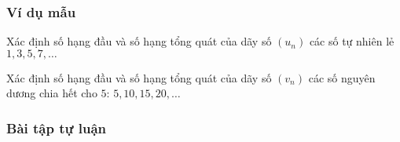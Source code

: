 \subsubsection{Ví dụ mẫu}
\begin{vd}[NB]%
	Xác định số hạng đầu và số hạng tổng quát của dãy số $(u_n)$ các số tự nhiên lẻ $1, 3, 5, 7, \ldots $
\end{vd}
\begin{vd}[NB]%
	Xác định số hạng đầu và số hạng tổng quát của dãy số $(v_n)$ các số nguyên dương chia hết cho $5$: $5,10,15,20,\ldots$
\end{vd}
\subsubsection{Bài tập tự luận}
 
